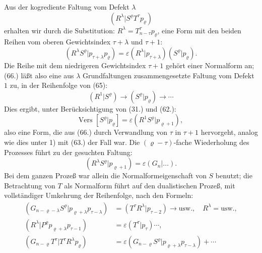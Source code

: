 \documentclass[12pt,a4paper]{article}
\begin{document}
Aus der kogrediente Faltung vom Defekt $\lambda$
\begin{equation*}
(R^{\lambda} | S^{\varrho} T^{\tau} p_{\varrho})
\end{equation*}
erhalten wir durch die Substitution: $R^{\lambda} = T^{\tau}_{n-\tau} p_{\varrho}$, eine Form mit den beiden Reihen vom oberen Gewichtsindex $\tau+\lambda$ und $\tau+1$:
\begin{equation}\tag{66}
(R^{\lambda} S^{\varrho} | p_{\tau+\lambda} p_{\varrho}) = \varepsilon (R^{\lambda} | p_{\tau+\lambda}) (S^{\varrho} | p_{\varrho}).
\end{equation}
Die Reihe mit dem niedrigeren Gewichtsindex $\tau+1$ gehört einer Normalform an; (66.) läßt also eine aus $\lambda$ Grundfaltungen zusammengesetzte Faltung vom Defekt~$1$ zu, in der Reihenfolge von (65):
\begin{equation*}
(R^{1} | S^{\varrho}) \to (S^{\varrho} | p_{\varrho}) \to \cdots
\end{equation*}
Dies ergibt, unter Berücksichtigung von (31.) und (62.):
\begin{equation*}
\text{Vers } [S^{\varrho} | p_{\varrho}] = \varepsilon (R^{1} S^{\varrho} | p_{\varrho+1}),
\end{equation*}
also eine Form, die aus (66.) durch Verwandlung von $\tau$ in $\tau+1$ hervorgeht, analog wie dies unter 1) mit (63.) der Fall war. Die $(\varrho-\tau)$-fache Wiederholung des Prozesses führt zu der gesuchten Faltung:
\begin{equation*}
(R^{\lambda} S^{\varrho} | p_{\varrho+1}) = \varepsilon (G_{n} | \ldots).
\end{equation*}
Bei dem ganzen Prozeß war allein die Normalformeigenschaft von $S$ benutzt; die Betrachtung von $T$ als Normalform führt auf den dualistischen Prozeß, mit vollständiger Umkehrung der Reihenfolge, nach den Formeln:
\begin{align*}
(G_{n-\varrho-\lambda} S^{\varrho} | p_{\varrho+\lambda} p_{\tau-\lambda}) &= (T^{\tau} R^{\lambda} | p_{\tau-2}) \to \text{usw.}, \quad R^{\lambda} = \text{usw.}, \\
(R^{\lambda} | P^{\varrho} p_{\varrho+\lambda} p_{\tau-1}) &= \varepsilon (T^{\tau} | p_{\tau}) \cdots, \\
(G_{n-\varrho} T^{\tau} | T^{\tau} R^{\lambda} p_{\varrho}) &= \varepsilon (G_{n-\varrho} S^{\varrho} | p_{\varrho+\lambda} p_{\tau-\lambda}) + \cdots
\end{align*}
\end{document}
